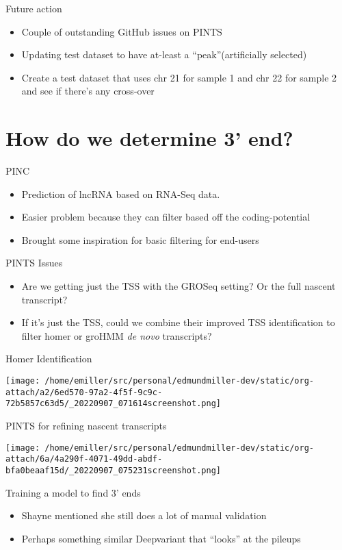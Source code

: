 \documentclass[bigger]{beamer}
\begin{document}
\begin{frame}[label={sec:orgd25cb4a}]{Future action}
\begin{itemize}
\item Couple of outstanding GitHub issues on PINTS
\item Updating test dataset to have at-least a ``peak''(artificially selected)
\item Create a test dataset that uses chr 21 for sample 1 and chr 22 for sample 2
and see if there's any cross-over
\end{itemize}
\end{frame}

\section*{How do we determine 3' end?}
\label{sec:orge93ebfa}
\begin{frame}[label={sec:orgcdfe424}]{PINC}
\begin{itemize}
\item Prediction of lncRNA based on RNA-Seq data.
\item Easier problem because they can filter based off the coding-potential
\item Brought some inspiration for basic filtering for end-users
\end{itemize}
\end{frame}

\begin{frame}[label={sec:orgc4caa34}]{PINTS Issues}
\begin{itemize}
\item Are we getting just the TSS with the GROSeq setting? Or the full nascent transcript?
\item If it's just the TSS, could we combine their improved TSS identification to
filter homer or groHMM \emph{de novo} transcripts?
\end{itemize}
\end{frame}

\begin{frame}[label={sec:orgb9cd6ab}]{Homer Identification}
\begin{center}
\texttt{[image: /home/emiller/src/personal/edmundmiller-dev/static/org-attach/a2/6ed570-97a2-4f5f-9c9c-72b5857c63d5/\_20220907\_071614screenshot.png]}
\end{center}
\end{frame}

\begin{frame}[label={sec:org95c0dcb}]{PINTS for refining nascent transcripts}
\begin{center}
\texttt{[image: /home/emiller/src/personal/edmundmiller-dev/static/org-attach/6a/4a290f-4071-49dd-abdf-bfa0beaaf15d/\_20220907\_075231screenshot.png]}
\end{center}
\end{frame}

\begin{frame}[label={sec:org5658131}]{Training a model to find 3' ends}
\begin{itemize}
\item Shayne mentioned she still does a lot of manual validation
\item Perhaps something similar Deepvariant that ``looks'' at the pileups
\end{itemize}
\end{frame}
\end{document}
